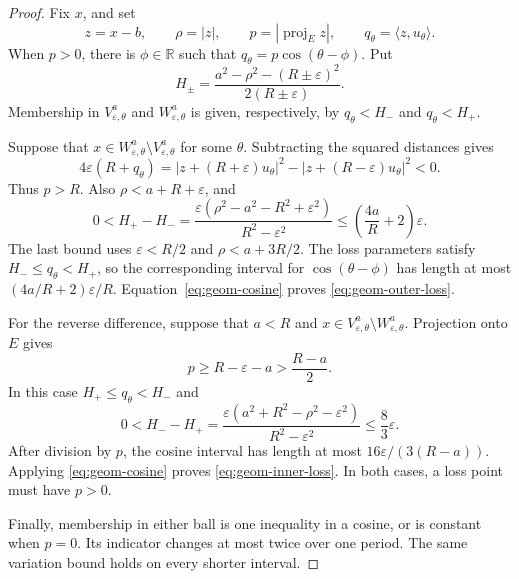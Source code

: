 \documentclass[12pt,reqno,tbtags]{amsart}
\def\R{\mathbb{R}}
\newcommand\inpro[2]{\langle #1,#2\rangle}
\newcommand\1{\mathbbm{1}}
\newcommand{\eps}{\varepsilon}
\begin{document}
\begin{proof}
Fix $x$, and set
\begin{equation*}
    z=x-b,\qquad \rho=|z|,\qquad p=|\operatorname{proj}_E z|,
    \qquad q_\theta=\inpro{z}{u_\theta}.
\end{equation*}
When $p>0$, there is $\phi\in\R$ such that
$q_\theta=p\cos(\theta-\phi)$. Put
\begin{equation*}
    H_\pm=\frac{a^2-\rho^2-(R\pm\eps)^2}{2(R\pm\eps)}.
\end{equation*}
Membership in $V_{\eps,\theta}^{a}$ and $W_{\eps,\theta}^{a}$ is given,
respectively, by $q_\theta<H_-$ and $q_\theta<H_+$.

Suppose that $x\in W_{\eps,\theta}^{a}\setminus V_{\eps,\theta}^{a}$
for some $\theta$. Subtracting the squared distances gives
\begin{equation*}
    4\eps(R+q_\theta)
    =|z+(R+\eps)u_\theta|^2-|z+(R-\eps)u_\theta|^2<0.
\end{equation*}
Thus $p>R$. Also $\rho<a+R+\eps$, and
\begin{equation}\label{eq:geom-threshold-width}
    0<H_+-H_-
    =\frac{\eps(\rho^2-a^2-R^2+\eps^2)}{R^2-\eps^2}
    \le\left(\frac{4a}{R}+2\right)\eps.
\end{equation}
The last bound uses $\eps<R/2$ and $\rho<a+3R/2$.
The loss parameters satisfy $H_-\le q_\theta<H_+$, so the corresponding
interval for $\cos(\theta-\phi)$ has length at most
$(4a/R+2)\eps/R$. Equation~\eqref{eq:geom-cosine} proves
\eqref{eq:geom-outer-loss}.

For the reverse difference, suppose that $a<R$ and
$x\in V_{\eps,\theta}^{a}\setminus W_{\eps,\theta}^{a}$.
Projection onto $E$ gives
\begin{equation*}
    p\ge R-\eps-a>\frac{R-a}{2}.
\end{equation*}
In this case $H_+\le q_\theta<H_-$ and
\begin{equation*}
    0<H_--H_+
    =\frac{\eps(a^2+R^2-\rho^2-\eps^2)}{R^2-\eps^2}
    \le\frac83\eps.
\end{equation*}
After division by $p$, the cosine interval has length at most
$16\eps/(3(R-a))$. Applying \eqref{eq:geom-cosine} proves
\eqref{eq:geom-inner-loss}. In both cases, a loss point must have $p>0$.

Finally, membership in either ball is one inequality in a cosine, or is
constant when $p=0$. Its indicator changes at most twice over one period.
The same variation bound holds on every shorter interval.
\end{proof}
\end{document}
